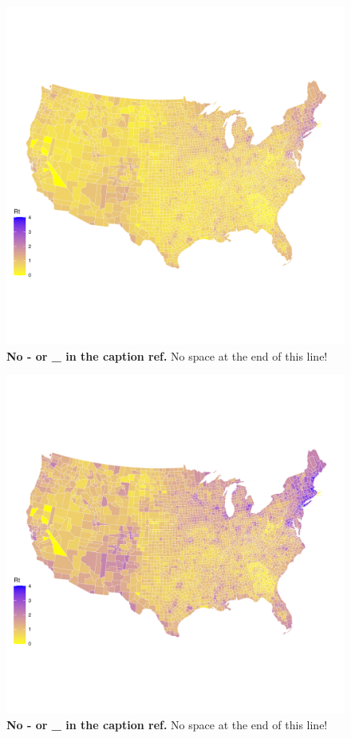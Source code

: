 \documentclass[
  12pt,
]{article}
\begin{document}
\begin{figure}[H]

{\centering \includegraphics{Final-Manuscript_files/figure-latex/fig7-1} 

}

\caption{\textbf{No - or \_ in the caption ref.} No space at the end of this line!}\label{fig:fig7}
\end{figure}



\begin{figure}[H]

{\centering \includegraphics{Final-Manuscript_files/figure-latex/fig8-1} 

}

\caption{\textbf{No - or \_ in the caption ref.} No space at the end of this line!}\label{fig:fig8}
\end{figure}
\end{document}

